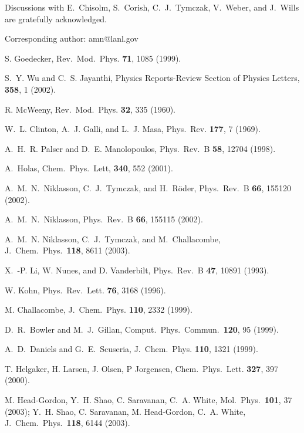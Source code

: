 Discussions with  E.\ Chisolm, S.\ Corish, C.\ J.\ Tymczak, V.\ Weber, and 
J.\ Wills are gratefully acknowledged.


\begin{references}

 Corresponding author: amn@lanl.gov

 S. Goedecker,
Rev.\ Mod.\ Phys. {\bf 71}, 1085 (1999).

 S.\ Y. Wu and C.\ S. Jayanthi,
Physics Reports-Review Section of Physics Letters, {\bf 358}, 1 (2002).

 R. McWeeny,
Rev.\ Mod.\ Phys. {\bf 32}, 335 (1960).

 W.\ L. Clinton, A.\ J. Galli, and L.\ J. Masa,
Phys.\ Rev. {\bf 177}, 7 (1969).

 A.\ H.\ R. Palser and D.\ E. Manolopoulos,
Phys.\ Rev.\ B {\bf 58}, 12704 (1998).

 A.\ Holas,
Chem.\ Phys.\ Lett, {\bf 340}, 552 (2001).

 A.\ M.\ N.\ Niklasson, C.\ J.\ Tymczak, and H.\ R\"{o}der,
Phys.\ Rev.\ B {\bf 66}, 155120 (2002).

 A.\ M.\ N.\ Niklasson, 
Phys.\ Rev.\ B {\bf 66}, 155115 (2002). 

 A.\ M.\ N. Niklasson, C.\ J.\ Tymczak, and M.\ Challacombe,
J.\ Chem.\ Phys.\ {\bf 118}, 8611 (2003).

 X.\ -P. Li, W. Nunes, and D. Vanderbilt,
Phys.\ Rev.\ B {\bf 47}, 10891 (1993).

 W. Kohn, Phys.\ Rev.\ Lett. {\bf 76}, 3168 (1996).

 M. Challacombe, 
J.\ Chem.\ Phys. {\bf 110}, 2332 (1999).

 D.\ R.\ Bowler and M.\ J.\ Gillan, 
Comput.\ Phys.\ Commun.\ {\bf 120}, 95 (1999).

 A.\ D.\ Daniels and G.\ E.\ Scuseria, 
J.\ Chem.\ Phys. {\bf 110}, 1321 (1999).

 T. Helgaker, H. Larsen, J. Olsen, P Jorgensen,
Chem.\ Phys.\ Lett. {\bf 327}, 397 (2000).

 M. Head-Gordon, Y.\ H.  Shao, C.  Saravanan, C.\ A. White,
Mol.\ Phys.\ {\bf 101}, 37 (2003);
Y.\ H.  Shao, C.  Saravanan, M. Head-Gordon, C.\ A. White,
J.\ Chem.\ Phys.\ {\bf 118}, 6144 (2003).


\end{references}
